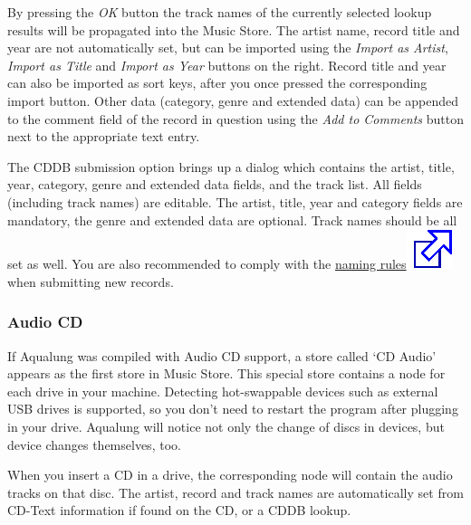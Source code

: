 \documentclass[10pt,english]{article}
\begin{document}
By pressing the \textsl{OK} button the track names of
the currently selected lookup results will be propagated
into the Music Store. The artist name, record title and year
are not automatically set, but can be imported using the
\textsl{Import as Artist}, \textsl{Import as Title} and
\textsl{Import as Year} buttons on the right. Record title
and year can also be imported as sort keys, after you once
pressed the corresponding import button. Other data
(category, genre and extended data) can be appended to the
comment field of the record in question using the \textsl{Add
to Comments} button next to the appropriate text
entry.




The CDDB submission option brings up a dialog which
contains the artist, title, year, category, genre and
extended data fields, and the track list. All fields
(including track names) are editable. The artist, title,
year and category fields are mandatory, the genre and
extended data are optional. Track names should be all set as
well. You are also recommended to comply with the \href{http://www.freedb.org/en/faq.3.html#22}{naming
rules\includegraphics[scale=0.5]{external.eps}} when submitting new records.




\subsubsection{Audio CD\label{idp589520}}



\noindent If Aqualung was compiled with Audio CD support, a store
called `CD Audio' appears as the first store in Music
Store. This special store contains a node for each drive in
your machine. Detecting hot-swappable devices such as
external USB drives is supported, so you don't need to
restart the program after plugging in your drive. Aqualung
will notice not only the change of discs in devices, but
device changes themselves, too.




When you insert a CD in a drive, the corresponding node
will contain the audio tracks on that disc. The artist,
record and track names are automatically set from CD-Text
information if found on the CD, or a CDDB lookup.
\end{document}
